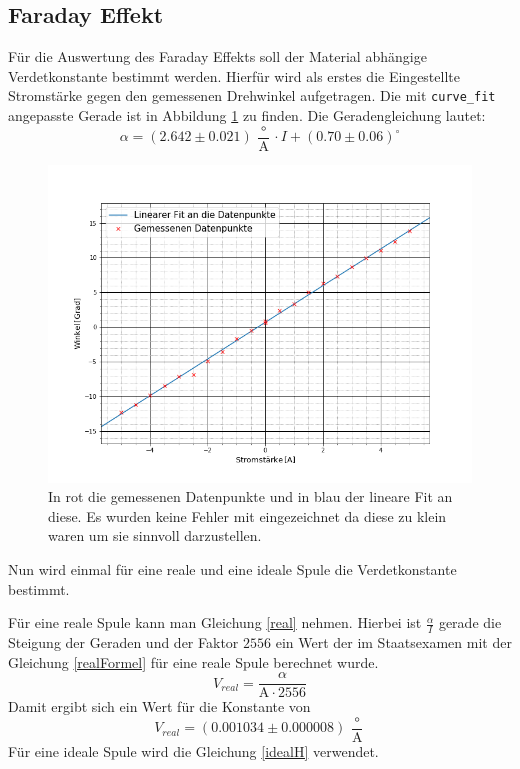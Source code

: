 \subsection{Faraday Effekt}
Für die Auswertung des Faraday Effekts soll der Material abhängige Verdetkonstante bestimmt werden. Hierfür wird als erstes die Eingestellte Stromstärke gegen den gemessenen Drehwinkel aufgetragen. Die mit \verb|curve_fit| angepasste Gerade ist in Abbildung \ref{Dreh} zu finden. Die Geradengleichung lautet:
$$\alpha=(2.642\pm0.021)\,\frac{\circ}{\text{A}}\cdot I + (0.70\pm0.06)^\circ$$
\begin{figure}[ht]
	\includegraphics[scale=0.5]{Bild/V2Lin}
	\centering
	\caption[Datenpunkte und Fit der Faraday Messung]{\small In rot die gemessenen Datenpunkte und in blau der lineare Fit an diese. Es wurden keine Fehler mit eingezeichnet da diese zu klein waren um sie sinnvoll darzustellen.}
	\label{Dreh}
\end{figure}
Nun wird einmal für eine reale und eine ideale Spule die Verdetkonstante bestimmt.\par
Für eine reale Spule kann man Gleichung \ref{real} nehmen. Hierbei ist $\frac{\alpha}{I}$ gerade die Steigung der Geraden und der Faktor $2556$ ein Wert der im Staatsexamen\cite{staatsexamen} mit der Gleichung \ref{realFormel} für eine reale Spule berechnet wurde.
\begin{equation}
	V_{real}=\frac{\alpha}{\text{A}\cdot 2556}
	\label{real}
\end{equation}
Damit ergibt sich ein Wert für die Konstante von $$V_{real}=(0.001034 \pm 0.000008)\,\frac{\circ}{\text{A}}$$
Für eine ideale Spule wird die Gleichung \ref{idealH} verwendet.
